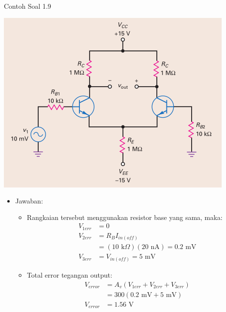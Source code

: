 \documentclass[aspectratio=169]{beamer}
\begin{document}
\begin{frame}{Contoh Soal 1.9}
	\begin{multicols}{2}
		\begin{center}
			\includegraphics[height=0.7\textheight]{gambar/01.contoh_soal_9}
		\end{center}
		\columnbreak
		\begin{itemize}
			\item Jawaban:
			\begin{itemize}
				\item Rangkaian tersebut menggunakan resistor base yang sama, maka:
				\begin{align*}
					V_{1err} &= 0 \\
					V_{2err} &= R_{B}I_{in(off)} \\
					&= (10 \text{ k}\Omega)(20 \text{ nA}) = 0.2 \text{ mV} \\
					V_{3err} &= V_{in(off)} = 5 \text{ mV}
				\end{align*}
			\item Total error tegangan output:
			\begin{align*}
				V_{error} &= A_v (V_{1err} + V_{2err} + V_{3err}) \\
				&= 300 (0.2 \text{ mV} + 5 \text{ mV}) \\
				V_{error} &= 1.56 \text{ V}
			\end{align*}
			\end{itemize}
		\end{itemize}
	\end{multicols}
\end{frame}
\end{document}
